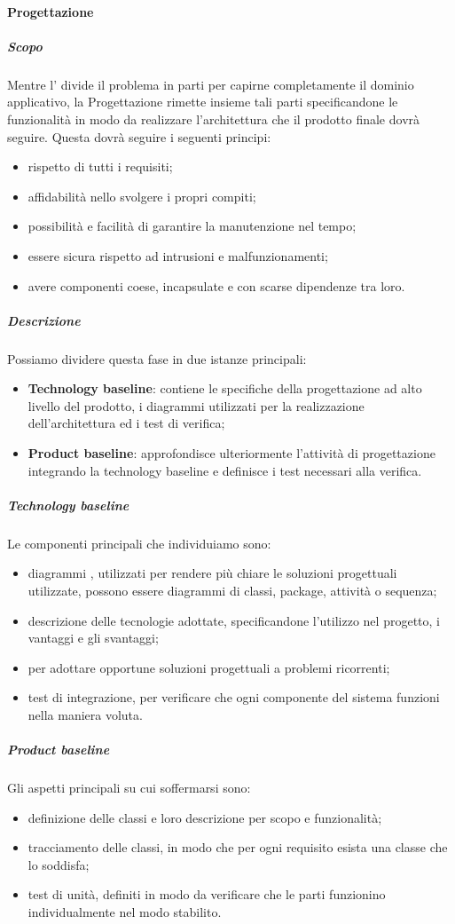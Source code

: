 			\paragraph{Progettazione}
			\subparagraph{Scopo}
			Mentre l' divide il problema in parti per capirne completamente il dominio applicativo, la Progettazione rimette insieme tali parti specificandone le funzionalità in modo da realizzare l'architettura che il prodotto finale dovrà seguire. Questa dovrà seguire i seguenti principi:
			\begin{itemize}
				\item rispetto di tutti i requisiti;
				\item affidabilità nello svolgere i propri compiti;
				\item possibilità e facilità di garantire la manutenzione nel tempo;
				\item essere sicura rispetto ad intrusioni e malfunzionamenti;
				\item avere componenti coese, incapsulate e con scarse dipendenze tra loro.
			\end{itemize}
			\subparagraph{Descrizione}
			Possiamo dividere questa fase in due istanze principali:
			\begin{itemize}
				\item \textbf{Technology baseline}: contiene le specifiche della progettazione ad alto livello del prodotto, i diagrammi  utilizzati per la realizzazione dell'architettura ed i test di verifica;
				\item \textbf{Product baseline}: approfondisce ulteriormente l'attività di progettazione integrando la technology baseline e definisce i test necessari alla verifica.
			\end{itemize}
			\subparagraph{Technology baseline}
			Le componenti principali che individuiamo sono:
			\begin{itemize}
				\item diagrammi , utilizzati per rendere più chiare le soluzioni progettuali utilizzate, possono essere diagrammi di classi, package, attività o sequenza;
				\item descrizione delle tecnologie adottate, specificandone l'utilizzo nel progetto, i vantaggi e gli svantaggi;
				\item {} per adottare opportune soluzioni progettuali a problemi ricorrenti;
				\item test di integrazione, per verificare che ogni componente del sistema funzioni nella maniera voluta.
			\end{itemize}
			\subparagraph{Product baseline}
			Gli aspetti principali su cui soffermarsi sono:
			\begin{itemize}
				\item definizione delle classi e loro descrizione per scopo e funzionalità;
				\item tracciamento delle classi, in modo che per ogni requisito esista una classe che lo soddisfa;
				\item test di unità, definiti in modo da verificare che le parti funzionino individualmente nel modo stabilito.
			\end{itemize}

